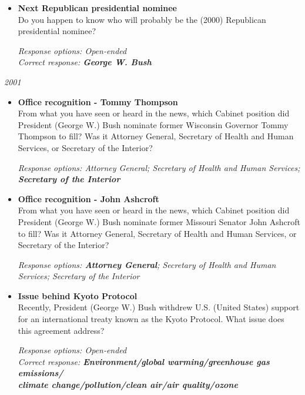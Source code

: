 \documentclass[12pt, letterpaper]{article}
\begin{document}
  \begin{itemize}
\item \textbf{Next Republican presidential nominee}\\
Do you happen to know who will probably be the (2000) Republican presidential nominee?

\textit{Response options: Open-ended}\\
\textit{Correct response: \textbf{George W. Bush}}
\end{itemize}

 \large \noindent \textit{2001} 
\normalsize
  \begin{itemize}
\item \textbf{Office recognition - Tommy Thompson}\\
From what you have seen or heard in the news, which Cabinet position did President (George W.) Bush nominate former Wisconsin Governor Tommy Thompson to fill? Was it Attorney General, Secretary of Health and Human Services, or Secretary of the Interior?

\textit{Response options: Attorney General; Secretary of Health and Human Services; \textbf{Secretary of the Interior}}
\end{itemize}

  \begin{itemize}
\item \textbf{Office recognition - John Ashcroft}\\
From what you have seen or heard in the news, which Cabinet position did President (George W.) Bush nominate former Missouri Senator John Ashcroft to fill? Was it Attorney General, Secretary of Health and Human Services, or Secretary of the Interior?

\textit{Response options: \textbf{Attorney General}; Secretary of Health and Human Services; Secretary of the Interior}
\end{itemize}

  \begin{itemize}
\item \textbf{Issue behind Kyoto Protocol}\\
Recently, President (George W.) Bush withdrew U.S. (United States) support for an international treaty known as the Kyoto Protocol. What issue does this agreement address?

\textit{Response options: Open-ended}\\
\textit{Correct response: \textbf{Environment/global warming/greenhouse gas emissions/\\climate change/pollution/clean air/air quality/ozone}}
\end{itemize}
\end{document}
